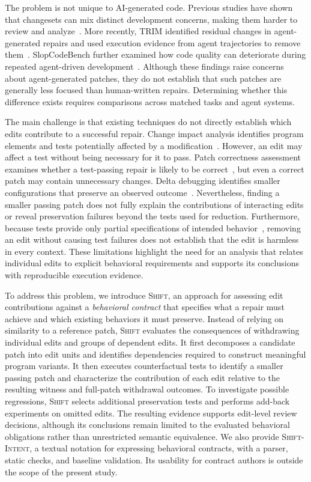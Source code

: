 \documentclass[a4paper,fleqn]{cas-sc}
\newcommand{\tool}{\textsc{Shift}}
\newcommand{\dsl}{\textsc{Shift-Intent}}
\begin{document}
The problem is not unique to AI-generated code. Previous studies have shown that changesets can mix distinct development concerns, making them harder to review and analyze~\citep{herzig2013tangled,barnett2015untangle}. More recently, TRIM identified residual changes in agent-generated repairs and used execution evidence from agent trajectories to remove them~\citep{mathai2026trim}. SlopCodeBench further examined how code quality can deteriorate during repeated agent-driven development~\citep{orlanski2026slopcodebench}. Although these findings raise concerns about agent-generated patches, they do not establish that such patches are generally less focused than human-written repairs. Determining whether this difference exists requires comparisons across matched tasks and agent systems.

The main challenge is that existing techniques do not directly establish which edits contribute to a successful repair. Change impact analysis identifies program elements and tests potentially affected by a modification~\citep{li2013cia,ren2004chianti}. However, an edit may affect a test without being necessary for it to pass. Patch correctness assessment examines whether a test-passing repair is likely to be correct~\citep{qi2015kali,smith2015cure,wang2020apr}, but even a correct patch may contain unnecessary changes. Delta debugging identifies smaller configurations that preserve an observed outcome~\citep{zeller2002ddmin}. Nevertheless, finding a smaller passing patch does not fully explain the contributions of interacting edits or reveal preservation failures beyond the tests used for reduction. Furthermore, because tests provide only partial specifications of intended behavior~\citep{barr2015oracle}, removing an edit without causing test failures does not establish that the edit is harmless in every context. These limitations highlight the need for an analysis that relates individual edits to explicit behavioral requirements and supports its conclusions with reproducible execution evidence.

To address this problem, we introduce \tool{}, an approach for assessing edit contributions against a \emph{behavioral contract} that specifies what a repair must achieve and which existing behaviors it must preserve. Instead of relying on similarity to a reference patch, \tool{} evaluates the consequences of withdrawing individual edits and groups of dependent edits. It first decomposes a candidate patch into edit units and identifies dependencies required to construct meaningful program variants. It then executes counterfactual tests to identify a smaller passing patch and characterize the contribution of each edit relative to the resulting witness and full-patch withdrawal outcomes. To investigate possible regressions, \tool{} selects additional preservation tests and performs add-back experiments on omitted edits. The resulting evidence supports edit-level review decisions, although its conclusions remain limited to the evaluated behavioral obligations rather than unrestricted semantic equivalence. We also provide \dsl{}, a textual notation for expressing behavioral contracts, with a parser, static checks, and baseline validation. Its usability for contract authors is outside the scope of the present study.
\end{document}

